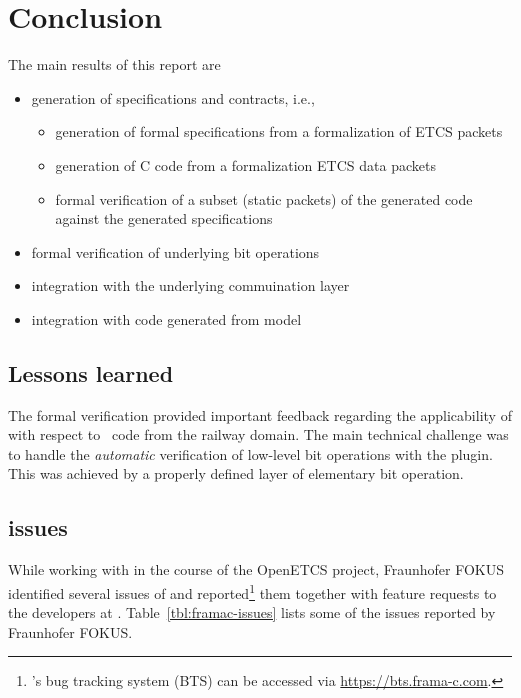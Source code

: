 
\chapter{Conclusion}
\label{cha:conclusions}

The main results of this report are

\begin{itemize}
\item generation of specifications and contracts, i.e.,
\begin{itemize}
\item generation of formal specifications from a formalization of ETCS packets
\item generation of C code from a formalization ETCS data packets
\item formal verification of a subset (static packets) of the generated code against the generated specifications
\end{itemize}
\item formal verification of underlying bit operations
\item integration with the underlying commuination layer
\item integration with code generated from \scade model
\end{itemize}

\section{Lessons learned}

The formal verification provided important feedback
regarding the applicability of \framac with respect to
\isoc~code from the railway domain.
The main technical challenge was to handle the \emph{automatic}
verification of low-level bit operations with the \framacwp plugin.
This was achieved by a properly defined layer of elementary bit operation.

\section{\framac issues}

While working with \framac in the course of the OpenETCS project,
Fraunhofer FOKUS identified several issues of \framac and reported\footnote{%
\framac's bug tracking system (BTS) can be accessed via \url{https://bts.frama-c.com}.
} them 
together with feature requests to
the developers at \cealist.
Table~\ref{tbl:framac-issues} lists some of the issues reported by Fraunhofer FOKUS.

